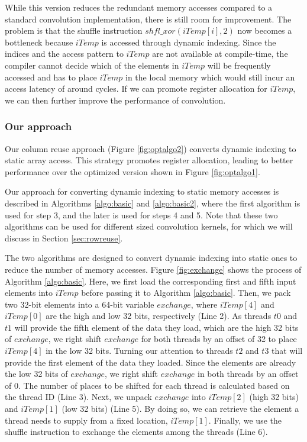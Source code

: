 
While this version reduces the redundant memory accesses compared to a standard convolution implementation, there is still room for
improvement. The problem is that the shuffle instruction $shfl\_xor(iTemp[i],2)$ now becomes a bottleneck because $iTemp$ is accessed
through dynamic indexing. Since the indices and the access pattern to $iTemp$ are not available at compile-time, the compiler cannot decide
which of the elements in $iTemp$ will be frequently accessed and has to place $iTemp$ in the local memory which would still incur an access
latency of around  cycles. If we can promote register allocation for $iTemp$, we can then further improve the performance of
convolution.


\subsubsection{Our approach}
Our column reuse approach (Figure \ref {fig:optalgo2}) converts dynamic indexing to static array access. This strategy promotes register
allocation, leading to better performance over the optimized version shown in Figure \ref{fig:optalgo1}.

Our approach for converting dynamic indexing to static memory accesses is described in Algorithms \ref{algo:basic} and \ref{algo:basic2},
where the first algorithm is used for step 3, and the later is used for steps 4 and 5. Note that these two algorithms can be used for
different sized convolution kernels, for which we will discuss in Section \ref {sec:rowreuse}.

The two algorithms are designed to convert dynamic indexing into static ones to reduce the number of memory accesses. Figure
\ref{fig:exchange} shows the process of Algorithm \ref{algo:basic}. Here, we first load the corresponding first and fifth input elements
into $iTemp$ before passing it to Algorithm \ref{algo:basic}. Then, we pack two 32-bit elements into a 64-bit variable $exchange$, where
$iTemp[4]$ and $iTemp[0]$ are the high and low 32 bits, respectively (Line 2).  As threads $t0$ and $t1$ will provide the fifth element of
the data they load, which are the high 32 bits of $exchange$, we right shift $exchange$ for both threads by an offset of 32 to place
$iTemp[4]$ in the low 32 bits. Turning our attention to threads $t2$ and $t3$ that will provide the first element of the data they loaded.
Since the elements are already the low 32 bits of $exchange$, we right shift $exchange$ in both threads by an offset of 0. The number of
places to be shifted for each thread is calculated based on the thread ID (Line 3). Next, we unpack $exchange$ into $iTemp[2]$ (high 32
bits) and $iTemp[1]$ (low 32 bits) (Line 5). By doing so, we can retrieve the element a thread needs to supply from a fixed location,
$iTemp[1]$. Finally, we use the shuffle instruction to exchange the elements among the threads (Line 6).


